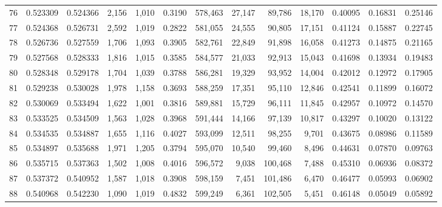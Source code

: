 \begin{tabular}{rrrrrrrrrrrrr}
76 &  0.523309 &  0.524366 &   2,156 &  1,010 &                                     0.3190 &  578,463 &   27,147 &   89,786 &   18,170 &  0.40095 &  0.16831 &  0.25146 \\
77 &  0.524368 &  0.526731 &   2,592 &  1,019 &                                     0.2822 &  581,055 &   24,555 &   90,805 &   17,151 &  0.41124 &  0.15887 &  0.22745 \\
78 &  0.526736 &  0.527559 &   1,706 &  1,093 &                                     0.3905 &  582,761 &   22,849 &   91,898 &   16,058 &  0.41273 &  0.14875 &  0.21165 \\
79 &  0.527568 &  0.528333 &   1,816 &  1,015 &                                     0.3585 &  584,577 &   21,033 &   92,913 &   15,043 &  0.41698 &  0.13934 &  0.19483 \\
80 &  0.528348 &  0.529178 &   1,704 &  1,039 &                                     0.3788 &  586,281 &   19,329 &   93,952 &   14,004 &  0.42012 &  0.12972 &  0.17905 \\
81 &  0.529238 &  0.530028 &   1,978 &  1,158 &                                     0.3693 &  588,259 &   17,351 &   95,110 &   12,846 &  0.42541 &  0.11899 &  0.16072 \\
82 &  0.530069 &  0.533494 &   1,622 &  1,001 &                                     0.3816 &  589,881 &   15,729 &   96,111 &   11,845 &  0.42957 &  0.10972 &  0.14570 \\
83 &  0.533525 &  0.534509 &   1,563 &  1,028 &                                     0.3968 &  591,444 &   14,166 &   97,139 &   10,817 &  0.43297 &  0.10020 &  0.13122 \\
84 &  0.534535 &  0.534887 &   1,655 &  1,116 &                                     0.4027 &  593,099 &   12,511 &   98,255 &    9,701 &  0.43675 &  0.08986 &  0.11589 \\
85 &  0.534897 &  0.535688 &   1,971 &  1,205 &                                     0.3794 &  595,070 &   10,540 &   99,460 &    8,496 &  0.44631 &  0.07870 &  0.09763 \\
86 &  0.535715 &  0.537363 &   1,502 &  1,008 &                                     0.4016 &  596,572 &    9,038 &  100,468 &    7,488 &  0.45310 &  0.06936 &  0.08372 \\
87 &  0.537372 &  0.540952 &   1,587 &  1,018 &                                     0.3908 &  598,159 &    7,451 &  101,486 &    6,470 &  0.46477 &  0.05993 &  0.06902 \\
88 &  0.540968 &  0.542230 &   1,090 &  1,019 &                                     0.4832 &  599,249 &    6,361 &  102,505 &    5,451 &  0.46148 &  0.05049 &  0.05892 \\

\end{tabular}
